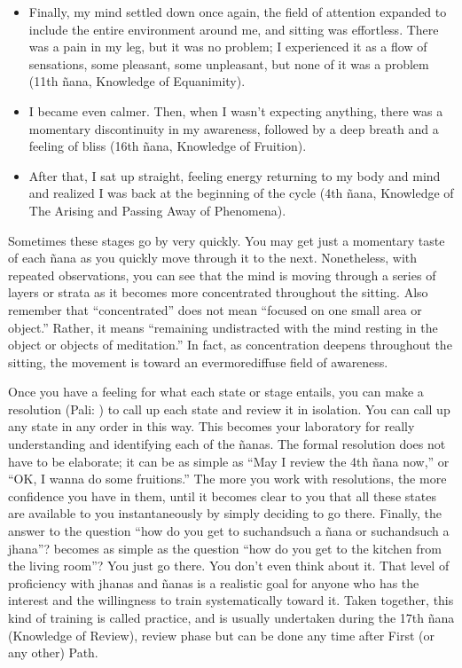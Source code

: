 \documentclass[a5paper,10pt,english]{book}
\begin{document}
\begin{itemize}
\item {} 
\sphinxAtStartPar
Finally, my mind settled down once again, the field of attention
expanded to include the entire environment around me, and sitting was
effortless. There was a pain in my leg, but it was no problem; I
experienced it as a flow of sensations, some pleasant, some
unpleasant, but none of it was a problem (11th ñana, Knowledge of
Equanimity).

\item {} 
\sphinxAtStartPar
I became even calmer. Then, when I wasn’t expecting anything, there
was a momentary discontinuity in my awareness, followed by a deep
breath and a feeling of bliss (16th ñana, Knowledge of Fruition).

\item {} 
\sphinxAtStartPar
After that, I sat up straight, feeling energy returning to my body
and mind and realized I was back at the beginning of the cycle (4th
ñana, Knowledge of The Arising and Passing Away of Phenomena).

\end{itemize}

\sphinxAtStartPar
Sometimes these stages go by very quickly. You may get just a momentary
taste of each ñana as you quickly move through it to the next.
Nonetheless, with repeated observations, you can see that the mind is
moving through a series of layers or strata as it becomes more
concentrated throughout the sitting. Also remember that “concentrated”
does not mean “focused on one small area or object.” Rather, it means
“remaining undistracted with the mind resting in the object or objects
of meditation.” In fact, as concentration deepens throughout the
sitting, the movement is toward an ever\sphinxhyphen{}more\sphinxhyphen{}diffuse field of awareness.

\sphinxAtStartPar
Once you have a feeling for what each state or stage entails, you can
make a resolution (Pali: ) to call up each state and review
it in isolation. You can call up any state in any order in this way.
This becomes your laboratory for really understanding and identifying
each of the ñanas. The formal resolution does not have to be elaborate;
it can be as simple as “May I review the 4th ñana now,” or “OK, I wanna
do some fruitions.” The more you work with resolutions, the more
confidence you have in them, until it becomes clear to you that all
these states are available to you instantaneously by simply deciding to
go there. Finally, the answer to the question “how do you get to
such\sphinxhyphen{}and\sphinxhyphen{}such a ñana or such\sphinxhyphen{}and\sphinxhyphen{}such a jhana”? becomes as simple as the
question “how do you get to the kitchen from the living room”? You just
go there. You don’t even think about it. That level of proficiency with
jhanas and ñanas is a realistic goal for anyone who has the interest and
the willingness to train systematically toward it. Taken together, this
kind of training is called  practice, and is usually
undertaken during the 17th ñana (Knowledge of Review), review phase but
can be done any time after First (or any other) Path.
\end{document}
